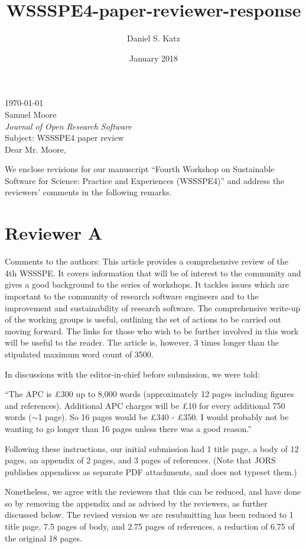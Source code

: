 \documentclass[11pt]{article}
\title{WSSSPE4-paper-reviewer-response}
\author{Daniel S. Katz}
\date{January 2018}
\begin{document}
\today\\

Samuel Moore\\
\textit{Journal of Open Research Software}\\

Subject: WSSSPE4 paper review\\

Dear Mr. Moore,

We enclose revisions for our manuscript ``Fourth Workshop on Sustainable Software for Science: Practice and Experiences
(WSSSPE4)'' and address the reviewers' comments in the following remarks.


\section*{Reviewer A}

\begin{quoting}
Comments to the authors: 
This article provides a comprehensive review of the 4th WSSSPE.  It covers information that will be of interest to the community and gives a good background to the series of workshops.  It tackles issues which are important to the community of research software engineers and to the improvement and sustainability of research software.
The comprehensive write-up of the working groups is useful, outlining the set of actions to be carried out moving forward. The links for those who wish to be further involved in this work will be useful to the reader.
The article is, however, 3 times longer than the stipulated maximum word count of 3500. 
\end{quoting}

In discussions with the editor-in-chief before submission, we were told:

``The APC is \pounds300 up to 8,000 words (approximately 12 pages including
figures and references). Additional APC charges will be \pounds10 for every
additional 750 words ($\sim$1 page).
So 16 pages would be \pounds340 - \pounds350. I would probably not be wanting to
go longer than 16 pages unless there was a good reason.''

Following these instructions, our initial submission had 1 title page, a body of 12 pages, an appendix of 2 pages, and 3 pages of references. (Note that JORS publishes appendices as separate PDF attachments, and does not typeset them.)

Nonetheless, we agree with the reviewers that this can be reduced, and have done so by removing the appendix and as advised by the reviewers, as further discussed below.  The revised version we are resubmitting has been reduced to 1 title page, 7.5 pages of body, and 2.75 pages of references, a reduction of 6.75 of the original 18 pages.
\end{document}
